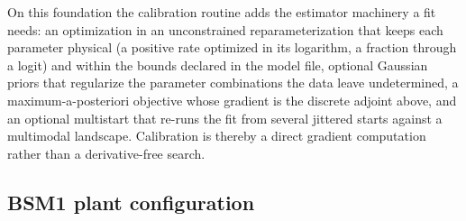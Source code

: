 \documentclass{article}
\begin{document}
On this foundation the calibration routine adds the estimator machinery a fit needs: an optimization in an unconstrained reparameterization that keeps each parameter physical (a positive rate optimized in its logarithm, a fraction through a logit) and within the bounds declared in the model file, optional Gaussian priors that regularize the parameter combinations the data leave undetermined, a maximum-a-posteriori objective whose gradient is the discrete adjoint above, and an optional multistart that re-runs the fit from several jittered starts against a multimodal landscape. Calibration is thereby a direct gradient computation rather than a derivative-free search.

\subsection{BSM1 plant configuration}
\label{sec:methods-bsm1config}
\end{document}
